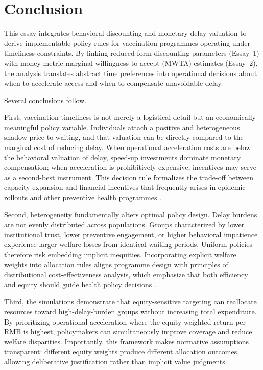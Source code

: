 \documentclass[doublespacing]{utdthesis}
\let\cite=\citep
\begin{document}
\clearpage

\section{Conclusion}
\label{sec:essay3_conclusion}

This essay integrates behavioral discounting and monetary delay valuation to derive implementable policy rules for vaccination programmes operating under timeliness constraints. By linking reduced-form discounting parameters (Essay~1) with money-metric marginal willingness-to-accept (MWTA) estimates (Essay~2), the analysis translates abstract time preferences into operational decisions about when to accelerate access and when to compensate unavoidable delay.

Several conclusions follow.

First, vaccination timeliness is not merely a logistical detail but an economically meaningful policy variable. Individuals attach a positive and heterogeneous shadow price to waiting, and that valuation can be directly compared to the marginal cost of reducing delay. When operational acceleration costs are below the behavioral valuation of delay, speed-up investments dominate monetary compensation; when acceleration is prohibitively expensive, incentives may serve as a second-best instrument. This decision rule formalizes the trade-off between capacity expansion and financial incentives that frequently arises in epidemic rollouts and other preventive health programmes \cite{Drummond2015,Thirumurthy2022}.

Second, heterogeneity fundamentally alters optimal policy design. Delay burdens are not evenly distributed across populations. Groups characterized by lower institutional trust, lower preventive engagement, or higher behavioral impatience experience larger welfare losses from identical waiting periods. Uniform policies therefore risk embedding implicit inequities. Incorporating explicit welfare weights into allocation rules aligns programme design with principles of distributional cost-effectiveness analysis, which emphasize that both efficiency and equity should guide health policy decisions \cite{Asaria2016,Cookson2017,Norheim2014}.

Third, the simulations demonstrate that equity-sensitive targeting can reallocate resources toward high-delay-burden groups without increasing total expenditure. By prioritizing operational acceleration where the equity-weighted return per RMB is highest, policymakers can simultaneously improve coverage and reduce welfare disparities. Importantly, this framework makes normative assumptions transparent: different equity weights produce different allocation outcomes, allowing deliberative justification rather than implicit value judgments.
\end{document}
